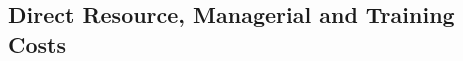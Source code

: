 \begin{appendices}

\begin{landscape}

\subsection{Direct Resource, Managerial and Training Costs}


\end{landscape}
\end{appendices}
